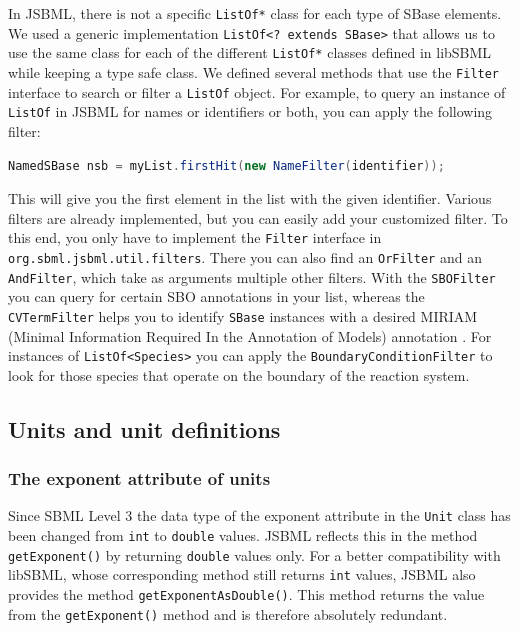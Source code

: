 In JSBML, there is not a specific
\texttt{ListOf*} class for each type of SBase
elements. We used a generic implementation
\texttt{ListOf<?~extends SBase>} that allows us to use the same class for each
of the different \texttt{ListOf*} classes defined in libSBML while keeping a
type safe class. We defined several methods that use the \texttt{Filter}
interface to search or filter a \texttt{ListOf} object. For example, to query an
instance of \texttt{ListOf} in JSBML for names or identifiers or both, you can
apply the following filter:
\begin{lstlisting}[language=Java,numbers=none]
NamedSBase nsb = myList.firstHit(new NameFilter(identifier));
\end{lstlisting}
This will give you the first element in the list with the given identifier.
Various filters are already implemented, but you can easily add your
customized filter. To this end, you only have to implement the \texttt{Filter}
%
interface in \texttt{org.sbml.jsbml.util.filters}.
%
There you can also find an \texttt{OrFilter} and an \texttt{AndFilter}, which
take as arguments multiple other filters. With the \texttt{SBOFilter} you can
query for certain SBO  annotations \citep{Novere2006,Novere2006b}
%
in your list, whereas the \texttt{CVTermFilter} helps you to identify
\texttt{SBase}
%
instances with a desired MIRIAM (Minimal Information Required In the Annotation
of Models) annotation \citep{Novere2005}. For instances of
\texttt{ListOf<Species>} you can apply the \texttt{BoundaryConditionFilter} to
look for those species that operate on the
boundary of the reaction system.


\subsection{Units and unit definitions}
\subsubsection{The exponent attribute of units}

Since SBML Level 3 \citep{Hucka2010a} the data type of the
exponent attribute in the \texttt{Unit} class has been changed from \texttt{int}
to \texttt{double} values. JSBML
%
%
%
reflects this in the method \texttt{getExponent()} by returning \texttt{double}
values only. For a better compatibility with libSBML, whose corresponding method
still returns \texttt{int} values, JSBML also provides the method
\texttt{getExponentAsDouble()}. This method returns the value from the
\texttt{getExponent()} method and is therefore absolutely redundant.


